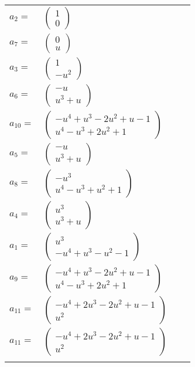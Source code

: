 \documentclass[1p]{elsarticle_modified}
\theoremstyle{definition}
\begin{document}
\begin{tabular}{m{7pt} m{180pt} m{7pt} m{180pt} }
\flushright $a_{2}=$&$\begin{pmatrix}1\\0\end{pmatrix}$ \\
\flushright $a_{7}=$&$\begin{pmatrix}0\\u\end{pmatrix}$ \\
\flushright $a_{3}=$&$\begin{pmatrix}1\\- u^2\end{pmatrix}$ \\
\flushright $a_{6}=$&$\begin{pmatrix}- u\\u^3+u\end{pmatrix}$ \\
\flushright $a_{10}=$&$\begin{pmatrix}- u^4+u^3-2 u^2+u-1\\u^4- u^3+2 u^2+1\end{pmatrix}$ \\
\flushright $a_{5}=$&$\begin{pmatrix}- u\\u^3+u\end{pmatrix}$ \\
\flushright $a_{8}=$&$\begin{pmatrix}- u^3\\u^4- u^3+u^2+1\end{pmatrix}$ \\
\flushright $a_{4}=$&$\begin{pmatrix}u^3\\u^3+u\end{pmatrix}$ \\
\flushright $a_{1}=$&$\begin{pmatrix}u^3\\- u^4+u^3- u^2-1\end{pmatrix}$ \\
\flushright $a_{9}=$&$\begin{pmatrix}- u^4+u^3-2 u^2+u-1\\u^4- u^3+2 u^2+1\end{pmatrix}$ \\
\flushright $a_{11}=$&$\begin{pmatrix}- u^4+2 u^3-2 u^2+u-1\\u^2\end{pmatrix}$\\ \flushright $a_{11}=$&$\begin{pmatrix}- u^4+2 u^3-2 u^2+u-1\\u^2\end{pmatrix}$\\&\end{tabular}
\end{document}
